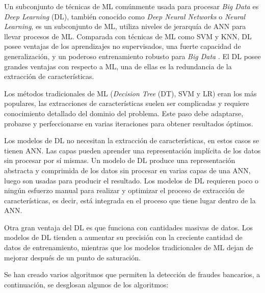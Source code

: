   Un subconjunto de t\'{e}cnicas de ML com\'{u}nmente usada para procesar \textit{Big Data} es \textit{Deep Learning} (DL), tambi\'{e}n conocido como \textit{Deep Neural Networks} o \textit{Neural Learning}, es un subconjunto de ML, utiliza niveles de jerarqu\'{i}a de ANN para llevar procesos de ML. Comparada con t\'{e}cnicas de ML como SVM y KNN, DL posee ventajas de los aprendizajes no supervisados, una fuerte capacidad de generalizaci\'{o}n, y un poderoso entrenamiento robusto para \textit{Big Data} \cite{15}. El DL posee grandes ventajas con respecto a ML, una de ellas es la redundancia de la extracci\'{o}n de caracter\'{i}sticas.
  
  Los m\'{e}todos tradicionales de ML (\textit{Decision Tree} (DT), SVM y LR) eran los m\'{a}s populares, las extracciones de caracter\'{i}sticas suelen ser complicadas y requiere conocimiento detallado del dominio del problema. Este paso debe adaptarse, probarse y perfeccionarse en varias iteraciones para obtener resultados \'{o}ptimos.
  
  Los modelos de DL no necesitan la extracci\'{o}n de caracter\'{i}sticas, en estos casos se tienen ANN. Las capas pueden aprender una representaci\'{o}n impl\'{i}cita de los datos sin procesar por s\'{i} mismas. Un modelo de DL produce una representaci\'{o}n abstracta y comprimida de los datos sin procesar en varias capas de una ANN, luego son usadas para producir el resultado. Los modelos de DL requieren poco o ning\'{u}n esfuerzo manual para realizar y optimizar el proceso de extracci\'{o}n de caracter\'{i}sticas, es decir, est\'{a} integrada en el proceso que tiene lugar dentro de la ANN.
  
  Otra gran ventaja del DL es que funciona con cantidades masivas de datos. Los modelos de DL tienden a aumentar su precisi\'{o}n con la creciente cantidad de datos de entrenamiento, mientras que los modelos tradicionales de ML dejan de mejorar despu\'{e}s de un punto de saturaci\'{o}n.
  
  Se han creado varios algoritmos que permiten la detecci\'{o}n de fraudes bancarios, a continuaci\'{o}n, se desglosan algunos de los algoritmos:
  
